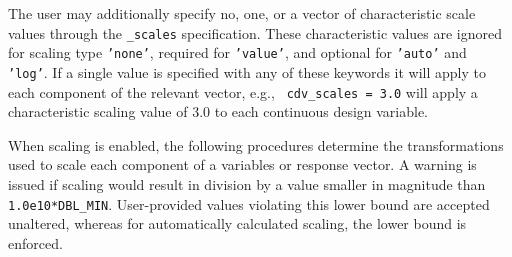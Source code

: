 The user may additionally specify no, one, or a vector of
characteristic scale values through the {\tt *\_scales} specification.
These characteristic values are ignored for scaling type {\tt 'none'},
required for {\tt 'value'}, and optional for {\tt 'auto'} and {\tt
  'log'}. If a single value is specified with any of these keywords it
will apply to each component of the relevant vector, e.g., {\tt
  cdv\_scales = 3.0} will apply a characteristic scaling value of 3.0
to each continuous design variable.

When scaling is enabled, the following procedures determine the
transformations used to scale each component of a variables or
response vector. A warning is issued if scaling would result in
division by a value smaller in magnitude than {\tt 1.0e10*DBL\_MIN}.
User-provided values violating this lower bound are accepted
unaltered, whereas for automatically calculated scaling, the lower
bound is enforced.

